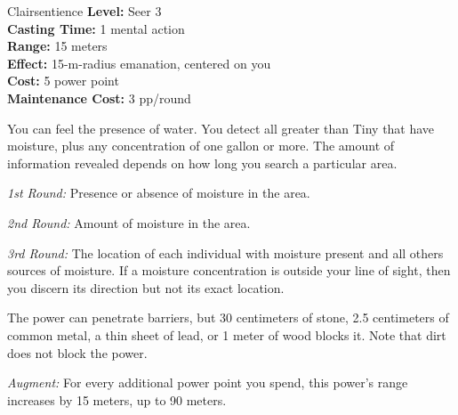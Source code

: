 {Clairsentience}
{
	\textbf{Level:}
	Seer 3\\
	\textbf{Casting Time:}
	1 mental action\\
	\textbf{Range:}
	15 meters\\
	\textbf{Effect:}
	15-m-radius emanation, centered on you\\
	\textbf{Cost:}
	5 power point\\
	\textbf{Maintenance Cost:}
	3 pp/round\\
}
{
	You can feel the presence of water. You detect all greater than Tiny that have moisture, plus any concentration of one gallon or more. The amount of information revealed depends on how long you search a particular area.

	\textit{1st Round:} Presence or absence of moisture in the area.

	\textit{2nd Round:} Amount of moisture in the area.

	\textit{3rd Round:} The location of each individual with moisture present and all others sources of moisture. If a moisture concentration is outside your line of sight, then you discern its direction but not its exact location.

	The power can penetrate barriers, but 30 centimeters of stone, 2.5 centimeters of common metal, a thin sheet of lead, or 1 meter of wood blocks it. Note that dirt does not block the power.

	\textit{Augment:} For every additional power point you spend, this power's range increases by 15 meters, up to 90 meters.
}